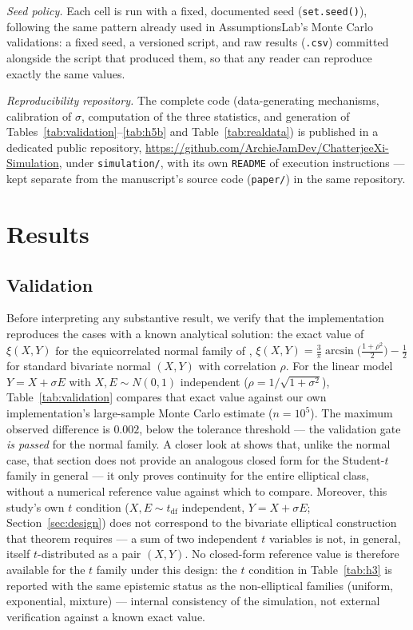 \documentclass[article]{ajs}
\begin{document}
\emph{Seed policy.} Each cell is run with a fixed, documented seed
(\texttt{set.seed()}), following the same pattern already used in
AssumptionsLab's Monte Carlo validations: a fixed seed, a versioned
script, and raw results (\texttt{.csv}) committed alongside the script
that produced them, so that any reader can reproduce exactly the same
values.

\emph{Reproducibility repository.} The complete code (data-generating
mechanisms, calibration of $\sigma$, computation of the three
statistics, and generation of Tables~\ref{tab:validation}--\ref{tab:h5b}
and Table~\ref{tab:realdata}) is
published in a dedicated public repository,
\url{https://github.com/ArchieJamDev/ChatterjeeXi-Simulation}, under
\texttt{simulation/}, with its own \texttt{README} of execution
instructions --- kept separate from the manuscript's source code
(\texttt{paper/}) in the same repository.

\section{Results} \label{sec:results}

\subsection{Validation}

Before interpreting any substantive result, we verify that the
implementation reproduces the cases with a known analytical solution:
the exact value of $\xi(X,Y)$ for the equicorrelated normal family of
\citet[Eq.~33]{ansari2026}, $\xi(X,Y) = \frac{3}{\pi}
\arcsin\!\big(\tfrac{1+\rho^2}{2}\big) - \tfrac{1}{2}$ for standard
bivariate normal $(X,Y)$ with correlation $\rho$. For the linear model
$Y = X + \sigma E$ with $X, E \sim N(0,1)$ independent
($\rho = 1/\sqrt{1+\sigma^2}$), Table~\ref{tab:validation} compares
that exact value against our own implementation's large-sample Monte
Carlo estimate ($n=10^5$). The maximum observed difference is $0.002$,
below the tolerance threshold --- the validation gate \emph{is
passed} for the normal family. A closer look at
\citet[Section 5.1]{ansari2026} shows that, unlike the normal case,
that section does not provide an analogous closed form for the
Student-$t$ family in general --- it only proves continuity for the
entire elliptical class, without a numerical reference value against
which to compare. Moreover, this study's own $t$ condition ($X, E \sim
t_{\text{df}}$ independent, $Y=X+\sigma E$; Section~\ref{sec:design})
does not correspond to the bivariate elliptical construction that
theorem requires --- a sum of two independent $t$ variables is not, in
general, itself $t$-distributed as a pair $(X,Y)$. No closed-form
reference value is therefore available for the $t$ family under this
design: the $t$ condition in Table~\ref{tab:h3} is reported with the
same epistemic status as the non-elliptical families (uniform,
exponential, mixture) --- internal consistency of the simulation, not
external verification against a known exact value.
\end{document}
